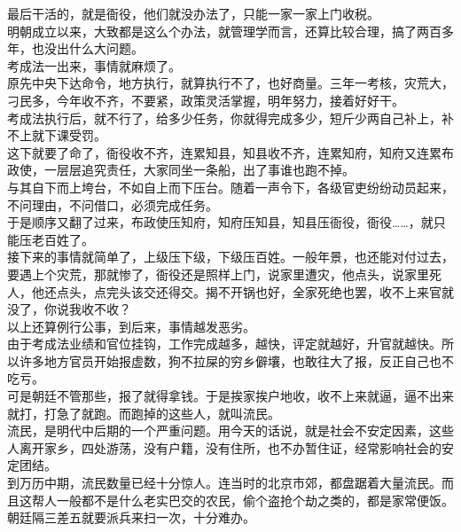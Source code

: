 \begin{multicols}{\theparacolNo}
最后干活的，就是衙役，他们就没办法了，只能一家一家上门收税。\\

明朝成立以来，大致都是这么个办法，就管理学而言，还算比较合理，搞了两百多年，也没出什么大问题。\\

考成法一出来，事情就麻烦了。\\

原先中央下达命令，地方执行，就算执行不了，也好商量。三年一考核，灾荒大，刁民多，今年收不齐，不要紧，政策灵活掌握，明年努力，接着好好干。\\

考成法执行后，就不行了，给多少任务，你就得完成多少，短斤少两自己补上，补不上就下课受罚。\\

这下就要了命了，衙役收不齐，连累知县，知县收不齐，连累知府，知府又连累布政使，一层层追究责任，大家同坐一条船，出了事谁也跑不掉。\\

与其自下而上垮台，不如自上而下压台。随着一声令下，各级官吏纷纷动员起来，不问理由，不问借口，必须完成任务。\\

于是顺序又翻了过来，布政使压知府，知府压知县，知县压衙役，衙役……，就只能压老百姓了。\\

接下来的事情就简单了，上级压下级，下级压百姓。一般年景，也还能对付过去，要遇上个灾荒，那就惨了，衙役还是照样上门，说家里遭灾，他点头，说家里死人，他还点头，点完头该交还得交。揭不开锅也好，全家死绝也罢，收不上来官就没了，你说我收不收？\\

以上还算例行公事，到后来，事情越发恶劣。\\

由于考成法业绩和官位挂钩，工作完成越多，越快，评定就越好，升官就越快。所以许多地方官员开始报虚数，狗不拉屎的穷乡僻壤，也敢往大了报，反正自己也不吃亏。\\

可是朝廷不管那些，报了就得拿钱。于是挨家挨户地收，收不上来就逼，逼不出来就打，打急了就跑。而跑掉的这些人，就叫流民。\\

流民，是明代中后期的一个严重问题。用今天的话说，就是社会不安定因素，这些人离开家乡，四处游荡，没有户籍，没有住所，也不办暂住证，经常影响社会的安定团结。\\

到万历中期，流民数量已经十分惊人。连当时的北京市郊，都盘踞着大量流民。而且这帮人一般都不是什么老实巴交的农民，偷个盗抢个劫之类的，都是家常便饭。朝廷隔三差五就要派兵来扫一次，十分难办。\\


\end{multicols}
